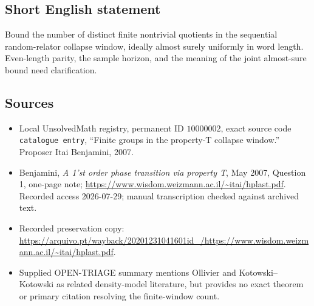 \documentclass[11pt]{article}
\begin{document}
\subsection{Short English statement}
Bound the number of distinct finite nontrivial quotients in the sequential random-relator collapse window, ideally almost surely uniformly in word length. Even-length parity, the sample horizon, and the meaning of the joint almost-sure bound need clarification.
\subsection{Sources}
\begin{itemize}
\item Local UnsolvedMath registry, permanent ID \(10000002\), exact source code \texttt{catalogue entry}, ``Finite groups in the property-T collapse window.'' Proposer Itai Benjamini, 2007.
\item Benjamini, \emph{A 1'st order phase transition via property T}, May 2007, Question 1, one-page note; \url{https://www.wisdom.weizmann.ac.il/~itai/hplast.pdf}. Recorded access 2026-07-29; manual transcription checked against archived text.
\item Recorded preservation copy: \url{https://arquivo.pt/wayback/20201231041601id_/https://www.wisdom.weizmann.ac.il/~itai/hplast.pdf}.
\item Supplied OPEN-TRIAGE summary mentions Ollivier and Kotowski--Kotowski as related density-model literature, but provides no exact theorem or primary citation resolving the finite-window count.
\end{itemize}
\end{document}
